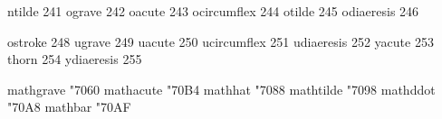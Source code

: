  ntilde            241
 ograve            242
 oacute            243
 ocircumflex       244
 otilde            245
 odiaeresis        246

 ostroke           248
 ugrave            249
 uacute            250
 ucircumflex       251
 udiaeresis        252
 yacute            253
 thorn             254
 ydiaeresis        255


%
%

\stopencoding


\startencoding[texnansi]

 mathgrave       "7060 
 mathacute       "70B4 
 mathhat         "7088 
 mathtilde       "7098 
 mathddot        "70A8 
 mathbar         "70AF 

\stopencoding

\endinput

% 
% 
% 
% 
